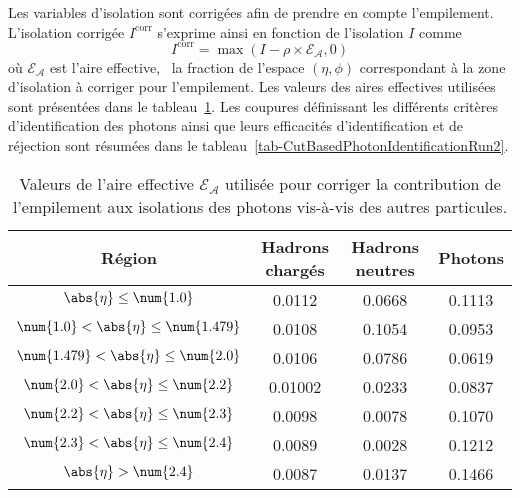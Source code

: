 \par Les variables d'isolation sont corrigées afin de prendre en compte l'empilement.
L'isolation corrigée $I^\text{corr}$ s'exprime ainsi en fonction de l'isolation $I$ comme
\begin{equation}
I^\text{corr} = \max\left( I - \rho \times \mathcal{E_A} , 0\right)
\end{equation}
où $\mathcal{E_A}$ est l'aire effective, \ie\ la fraction de l'espace $(\eta,\phi)$ correspondant à la zone d'isolation à corriger pour l'empilement. Les valeurs des aires effectives utilisées sont présentées dans le tableau~\ref{tab-CutBasedPhotonIdentificationRun2-effective_areas}.
Les coupures définissant les différents critères d'identification des photons ainsi que leurs efficacités d'identification et de réjection sont résumées dans le tableau~\ref{tab-CutBasedPhotonIdentificationRun2}.
\begin{table}[h]
\centering
\begin{tabular}{cccc}
\toprule
Région & Hadrons chargés & Hadrons neutres & Photons \\
\midrule
$\abs{\eta} \leq \num{1.0}$ & \num{0.0112} & \num{0.0668} & \num{0.1113} \\
$\num{1.0} < \abs{\eta} \leq \num{1.479}$ & \num{0.0108} & \num{0.1054} & \num{0.0953} \\
$\num{1.479} < \abs{\eta} \leq \num{2.0}$ & \num{0.0106} & \num{0.0786} & \num{0.0619} \\
$\num{2.0} < \abs{\eta} \leq \num{2.2}$ & \num{0.01002} & \num{0.0233} & \num{0.0837} \\
$\num{2.2} < \abs{\eta} \leq \num{2.3}$ & \num{0.0098} & \num{0.0078} & \num{0.1070} \\
$\num{2.3} < \abs{\eta} \leq \num{2.4}$ & \num{0.0089} & \num{0.0028} & \num{0.1212} \\
$\abs{\eta} > \num{2.4}$ & \num{0.0087} & \num{0.0137} & \num{0.1466} \\
\bottomrule
\end{tabular}
\caption[Aires effectives de correction de l'isolation du photon.]{Valeurs de l'aire effective $\mathcal{E_A}$ utilisée pour corriger la contribution de l'empilement aux isolations des photons vis-à-vis des autres particules.}
\label{tab-CutBasedPhotonIdentificationRun2-effective_areas}
\end{table}
